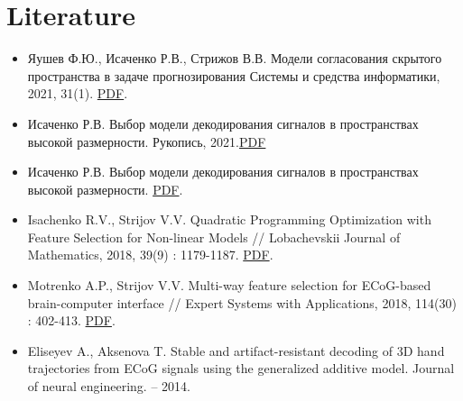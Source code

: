 \documentclass{article}
\begin{document}
\section{Literature}
\renewcommand\labelitemi{$\textasteriskcentered$}
\begin{itemize}
\item  Яушев Ф.Ю., Исаченко Р.В., Стрижов В.В. Модели согласования скрытого пространства в задаче прогнозирования  Системы и средства информатики, 2021, 31(1). \href{http://strijov.com/papers/Isachenko2020CanonicCorrelation.pdf}{PDF}.
\item  Исаченко Р.В. Выбор модели декодирования сигналов в пространствах высокой размерности. Рукопись, 2021.\href{https://github.com/r-isachenko/PhDThesis/raw/master/doc/Isachenko2021PhDThesis.pdf}{PDF} 
\item  Исаченко Р.В. Выбор модели декодирования сигналов в пространствах высокой размерности.  \href{http://strijov.com/papers/IsachenkoVladimirova2018PLS.pdf}{PDF}. 
\item  Isachenko R.V., Strijov V.V. Quadratic Programming Optimization with Feature Selection for Non-linear Models // Lobachevskii Journal of Mathematics, 2018, 39(9) : 1179-1187. \href{https://rdcu.be/bfR32}{PDF}. 
\item  Motrenko A.P., Strijov V.V. Multi-way feature selection for ECoG-based brain-computer interface // Expert Systems with Applications, 2018, 114(30) : 402-413. \href{http://strijov.com/papers/MotrenkoStrijov2017ECoG_HL_2.pdf}{PDF}. 
\item  Eliseyev A., Aksenova T. Stable and artifact-resistant decoding of 3D hand trajectories from ECoG signals using the generalized additive model. Journal of neural engineering. – 2014.
\end{itemize}
\end{document}
